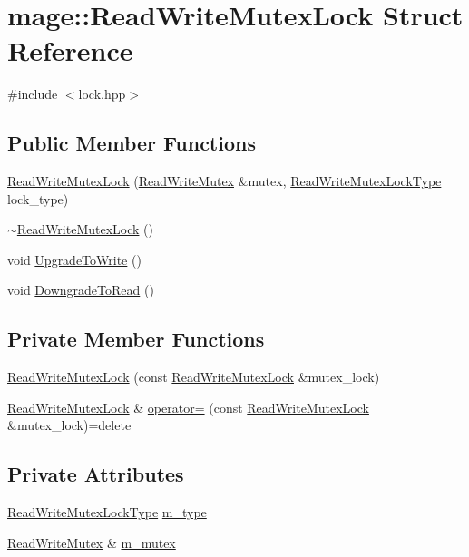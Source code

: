 \hypertarget{structmage_1_1_read_write_mutex_lock}{}\section{mage\+:\+:Read\+Write\+Mutex\+Lock Struct Reference}
\label{structmage_1_1_read_write_mutex_lock}


{\ttfamily \#include $<$lock.\+hpp$>$}

\subsection*{Public Member Functions}
\begin{DoxyCompactItemize}
\item 
\hyperlink{structmage_1_1_read_write_mutex_lock_a323e2f45646caa23c4ee21452c8f8d4a}{Read\+Write\+Mutex\+Lock} (\hyperlink{classmage_1_1_read_write_mutex}{Read\+Write\+Mutex} \&mutex, \hyperlink{namespacemage_afd76fcca37ce5c5b2227671290973c74}{Read\+Write\+Mutex\+Lock\+Type} lock\+\_\+type)
\item 
\hyperlink{structmage_1_1_read_write_mutex_lock_a64b600234d29ba7307fcd77a17486582}{$\sim$\+Read\+Write\+Mutex\+Lock} ()
\item 
void \hyperlink{structmage_1_1_read_write_mutex_lock_a01843784e8dbf0d3dfd6100562f699be}{Upgrade\+To\+Write} ()
\item 
void \hyperlink{structmage_1_1_read_write_mutex_lock_ad3292e579d09107c7361989657b9bade}{Downgrade\+To\+Read} ()
\end{DoxyCompactItemize}
\subsection*{Private Member Functions}
\begin{DoxyCompactItemize}
\item 
\hyperlink{structmage_1_1_read_write_mutex_lock_a5c040abe418a5d4d3a15420503568529}{Read\+Write\+Mutex\+Lock} (const \hyperlink{structmage_1_1_read_write_mutex_lock}{Read\+Write\+Mutex\+Lock} \&mutex\+\_\+lock)
\item 
\hyperlink{structmage_1_1_read_write_mutex_lock}{Read\+Write\+Mutex\+Lock} \& \hyperlink{structmage_1_1_read_write_mutex_lock_ade82a57f337e39a1515f67fbc1f6fc43}{operator=} (const \hyperlink{structmage_1_1_read_write_mutex_lock}{Read\+Write\+Mutex\+Lock} \&mutex\+\_\+lock)=delete
\end{DoxyCompactItemize}
\subsection*{Private Attributes}
\begin{DoxyCompactItemize}
\item 
\hyperlink{namespacemage_afd76fcca37ce5c5b2227671290973c74}{Read\+Write\+Mutex\+Lock\+Type} \hyperlink{structmage_1_1_read_write_mutex_lock_aa117ffe94f6850ddc91ad6d1389fb6e2}{m\+\_\+type}
\item 
\hyperlink{classmage_1_1_read_write_mutex}{Read\+Write\+Mutex} \& \hyperlink{structmage_1_1_read_write_mutex_lock_a6ee9034fa984e11ec07c20ec77ab1bfe}{m\+\_\+mutex}
\end{DoxyCompactItemize}


